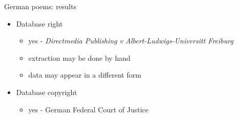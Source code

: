 \documentclass[aspectratio=169]{beamer}
\begin{document}
  \begin{frame}{German poems: results}
    \begin{itemize}
    \item Database right
      \begin{itemize}
      \item yes - \protect\textit{Directmedia Publishing v Albert-Ludwigs-Universitt Freiburg}
      \item extraction may be done by hand
      \item data may appear in a different form
      \end{itemize}
    \item Database copyright
      \begin{itemize}
      \item yes - German Federal Court of Justice
      \end{itemize}
    \end{itemize}
  \end{frame}
\end{document}
